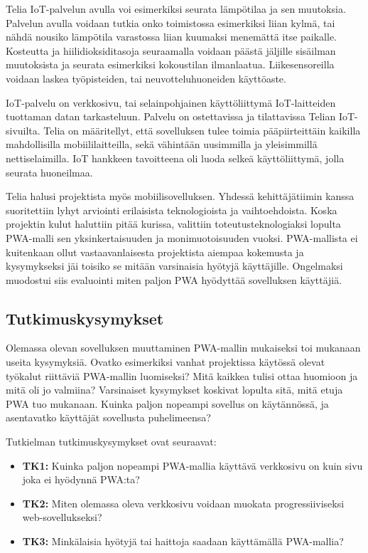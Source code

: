 \documentclass{tktltiki}
\begin{document}
Telia IoT-palvelun avulla voi esimerkiksi seurata lämpötilaa ja sen muutoksia. Palvelun avulla voidaan tutkia onko toimistossa esimerkiksi liian kylmä, tai nähdä nousiko lämpötila varastossa liian kuumaksi menemättä itse paikalle. Kosteutta ja hiilidioksiditasoja seuraamalla voidaan päästä jäljille sisäilman muutoksista ja seurata esimerkiksi kokoustilan ilmanlaatua. Liikesensoreilla voidaan laskea työpisteiden, tai neuvotteluhuoneiden käyttöaste. 

IoT-palvelu on verkkosivu, tai selainpohjainen käyttöliittymä IoT-laitteiden tuottaman datan tarkasteluun. Palvelu on ostettavissa ja tilattavissa Telian IoT-sivuilta. Telia on määritellyt, että sovelluksen tulee toimia pääpiirteittäin kaikilla mahdollisilla mobiililaitteilla, sekä vähintään uusimmilla ja yleisimmillä nettiselaimilla. IoT hankkeen tavoitteena oli luoda selkeä käyttöliittymä, jolla seurata huoneilmaa. 

Telia halusi projektista myös mobiilisovelluksen. Yhdessä kehittäjätiimin kanssa suoritettiin lyhyt arviointi erilaisista teknologioista ja vaihtoehdoista. Koska projektin kulut haluttiin pitää kurissa, valittiin toteutusteknologiaksi lopulta PWA-malli sen yksinkertaisuuden ja monimuotoisuuden vuoksi. PWA-mallista ei kuitenkaan ollut vastaavanlaisesta projektista aiempaa kokemusta ja kysymykseksi jäi toisiko se mitään varsinaisia hyötyjä käyttäjille. Ongelmaksi muodostui siis evaluointi miten paljon PWA hyödyttää sovelluksen käyttäjiä.

\subsection{Tutkimuskysymykset}

Olemassa olevan sovelluksen muuttaminen PWA-mallin mukaiseksi toi mukanaan useita kysymyksiä. Ovatko esimerkiksi vanhat projektissa käytössä olevat työkalut riittäviä PWA-mallin luomiseksi? Mitä kaikkea tulisi ottaa huomioon ja mitä oli jo valmiina? Varsinaiset kysymykset koskivat lopulta sitä, mitä etuja PWA tuo mukanaan. Kuinka paljon nopeampi sovellus on käytännössä, ja asentavatko käyttäjät sovellusta puhelimeensa?

Tutkielman tutkimuskysymykset ovat seuraavat:

\begin{itemize}
  \item \textbf{TK1:} Kuinka paljon nopeampi PWA-mallia käyttävä verkkosivu on kuin sivu joka ei hyödynnä PWA:ta?
  \item \textbf{TK2:} Miten olemassa oleva verkkosivu voidaan muokata progressiiviseksi web-sovellukseksi?
  \item \textbf{TK3:} Minkälaisia hyötyjä tai haittoja saadaan käyttämällä PWA-mallia? 
\end{itemize}
\end{document}
